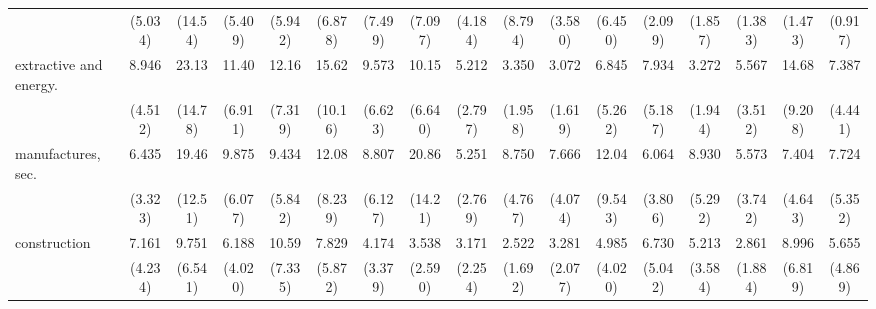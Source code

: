 {\begin{tabular}{l*{16}{c}}
                    &     (5.034)         &     (14.54)         &     (5.409)         &     (5.942)         &     (6.878)         &     (7.499)         &     (7.097)         &     (4.184)         &     (8.794)         &     (3.580)         &     (6.450)         &     (2.099)         &     (1.857)         &     (1.383)         &     (1.473)         &     (0.917)         \\
[1em]
extractive and energy.&       8.946\sym{***}&       23.13\sym{***}&       11.40\sym{***}&       12.16\sym{***}&       15.62\sym{***}&       9.573\sym{**} &       10.15\sym{***}&       5.212\sym{**} &       3.350\sym{*}  &       3.072\sym{*}  &       6.845\sym{*}  &       7.934\sym{**} &       3.272\sym{*}  &       5.567\sym{**} &       14.68\sym{***}&       7.387\sym{***}\\
                    &     (4.512)         &     (14.78)         &     (6.911)         &     (7.319)         &     (10.16)         &     (6.623)         &     (6.640)         &     (2.797)         &     (1.958)         &     (1.619)         &     (5.262)         &     (5.187)         &     (1.944)         &     (3.512)         &     (9.208)         &     (4.441)         \\
[1em]
manufactures, sec.  &       6.435\sym{***}&       19.46\sym{***}&       9.875\sym{***}&       9.434\sym{***}&       12.08\sym{***}&       8.807\sym{**} &       20.86\sym{***}&       5.251\sym{**} &       8.750\sym{***}&       7.666\sym{***}&       12.04\sym{**} &       6.064\sym{**} &       8.930\sym{***}&       5.573\sym{*}  &       7.404\sym{**} &       7.724\sym{**} \\
                    &     (3.323)         &     (12.51)         &     (6.077)         &     (5.842)         &     (8.239)         &     (6.127)         &     (14.21)         &     (2.769)         &     (4.767)         &     (4.074)         &     (9.543)         &     (3.806)         &     (5.292)         &     (3.742)         &     (4.643)         &     (5.352)         \\
[1em]
construction        &       7.161\sym{***}&       9.751\sym{***}&       6.188\sym{**} &       10.59\sym{***}&       7.829\sym{**} &       4.174         &       3.538         &       3.171         &       2.522         &       3.281         &       4.985\sym{*}  &       6.730\sym{*}  &       5.213\sym{*}  &       2.861         &       8.996\sym{**} &       5.655\sym{*}  \\
                    &     (4.234)         &     (6.541)         &     (4.020)         &     (7.335)         &     (5.872)         &     (3.379)         &     (2.590)         &     (2.254)         &     (1.692)         &     (2.077)         &     (4.020)         &     (5.042)         &     (3.584)         &     (1.884)         &     (6.819)         &     (4.869)         \\

\end{tabular}}
